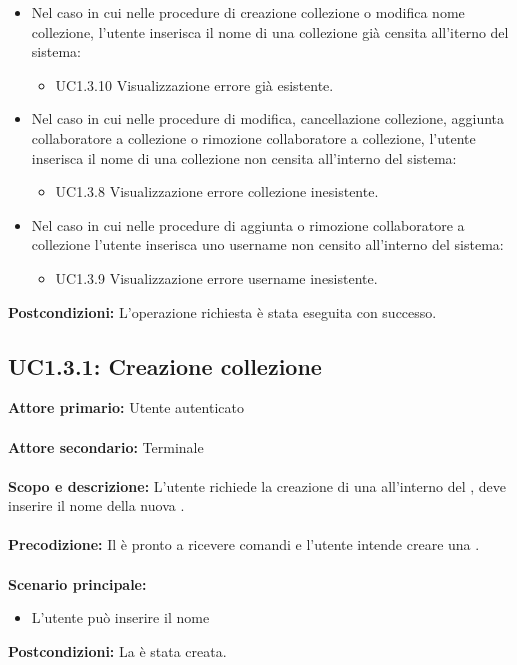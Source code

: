\documentclass{scalatekids-article}
\begin{document}
\begin{itemize}
\item Nel caso in cui nelle procedure di creazione collezione o modifica nome collezione, l'utente inserisca il nome di una collezione già censita all'iterno del sistema:
  \begin{itemize}
  \item UC1.3.10 Visualizzazione errore  già esistente.
  \end{itemize}
\item Nel caso in cui nelle procedure di modifica, cancellazione collezione, aggiunta collaboratore a collezione o rimozione collaboratore a collezione, l'utente inserisca il nome di una collezione non censita all'interno del sistema:
  \begin{itemize}
  \item UC1.3.8 Visualizzazione errore collezione inesistente.
  \end{itemize}
\item Nel caso in cui nelle procedure di aggiunta o rimozione collaboratore a collezione l'utente inserisca uno username non censito all'interno del sistema:
  \begin{itemize}
  \item UC1.3.9 Visualizzazione errore username inesistente.
  \end{itemize}
\end{itemize}
\textbf{Postcondizioni:} L'operazione richiesta è stata eseguita con successo.

\subsection{UC1.3.1: Creazione collezione}

\textbf{Attore primario:} Utente autenticato\\ \\
\textbf{Attore secondario:} Terminale\\ \\
\textbf{Scopo e descrizione:} L'utente richiede la creazione di una  all'interno del , deve inserire il nome della nuova .\\ \\
\textbf{Precodizione:} Il  è pronto a ricevere comandi e l'utente intende creare una .\\ \\
\textbf{Scenario principale:}
\begin{itemize}
  \item L'utente può inserire il nome  %
\end{itemize}
\textbf{Postcondizioni:} La  è stata creata.
\end{document}
